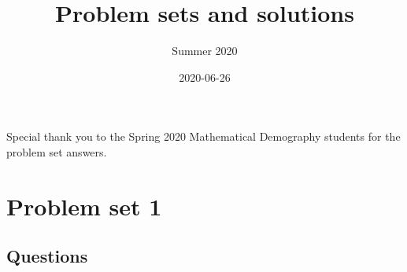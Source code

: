 \documentclass[]{book}
\title{Problem sets and solutions}
\author{Summer 2020}
\date{2020-06-26}
\begin{document}
\maketitle

{
\setcounter{tocdepth}{1}
\tableofcontents
}
Special thank you to the Spring 2020 Mathematical Demography students for the problem set answers.

\hypertarget{problem-set-1}{%
\chapter{Problem set 1}\label{problem-set-1}}

\hypertarget{questions}{%
\section{Questions}\label{questions}}
\end{document}
